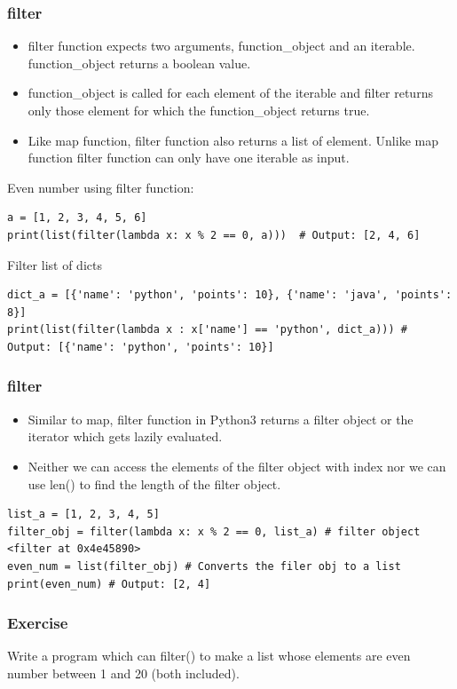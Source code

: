\begin{frame}[fragile]\frametitle{filter}
    \begin{itemize}
    \item  filter function expects two arguments, function\_object and an iterable. function\_object returns a boolean value. 
    \item function\_object is called for each element of the iterable and filter returns only those element for which the function\_object returns true.
    \item Like map function, filter function also returns a list of element. Unlike map function filter function can only have one iterable as input.
    \end{itemize}
    Even number using filter function:
    	    \begin{lstlisting}
a = [1, 2, 3, 4, 5, 6]
print(list(filter(lambda x: x % 2 == 0, a)))  # Output: [2, 4, 6]
\end{lstlisting}
Filter list of dicts
    	    \begin{lstlisting}
dict_a = [{'name': 'python', 'points': 10}, {'name': 'java', 'points': 8}]
print(list(filter(lambda x : x['name'] == 'python', dict_a))) # Output: [{'name': 'python', 'points': 10}]
\end{lstlisting}
\end{frame}


\begin{frame}[fragile]\frametitle{filter}
    \begin{itemize}
    \item  Similar to map, filter function in Python3 returns a filter object or the iterator which gets lazily evaluated. 
    \item Neither we can access the elements of the filter object with index nor we can use len() to find the length of the filter object.
    \end{itemize}
\begin{lstlisting}
list_a = [1, 2, 3, 4, 5]
filter_obj = filter(lambda x: x % 2 == 0, list_a) # filter object <filter at 0x4e45890>
even_num = list(filter_obj) # Converts the filer obj to a list
print(even_num) # Output: [2, 4]
\end{lstlisting}
\end{frame}

\begin{frame}[fragile]\frametitle{Exercise}
Write a program which can filter() to make a list whose elements are even number between 1 and 20 (both included).


\end{frame}


